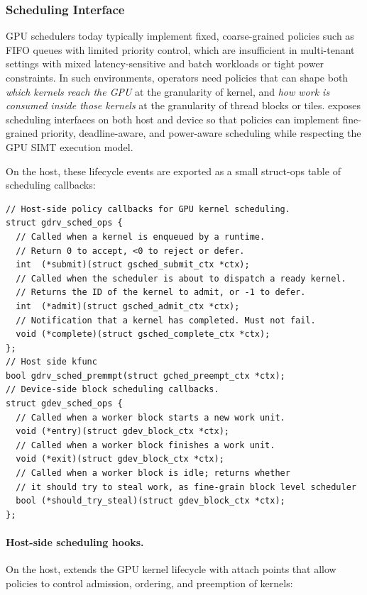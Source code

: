 \subsubsection{Scheduling Interface}
\label{sec:design-sched}

GPU schedulers today typically implement fixed, coarse-grained policies such as FIFO
queues with limited priority control, which are insufficient in multi-tenant settings
with mixed latency-sensitive and batch workloads or tight power constraints. In such
environments, operators need policies that can shape both \emph{which kernels reach
the GPU} at the granularity of kernel, and \emph{how work is consumed inside those kernels} at the granularity of thread blocks or tiles. \sys exposes scheduling interfaces on both host and device
so that policies can implement fine-grained priority, deadline-aware, and power-aware
scheduling while respecting the GPU SIMT execution model.

On the host, these lifecycle events are exported as a small struct-ops table of
scheduling callbacks:

\begin{verbatim}
// Host-side policy callbacks for GPU kernel scheduling.
struct gdrv_sched_ops {
  // Called when a kernel is enqueued by a runtime.
  // Return 0 to accept, <0 to reject or defer.
  int  (*submit)(struct gsched_submit_ctx *ctx);
  // Called when the scheduler is about to dispatch a ready kernel.
  // Returns the ID of the kernel to admit, or -1 to defer.
  int  (*admit)(struct gsched_admit_ctx *ctx);
  // Notification that a kernel has completed. Must not fail.
  void (*complete)(struct gsched_complete_ctx *ctx);
};
// Host side kfunc
bool gdrv_sched_premmpt(struct gched_preempt_ctx *ctx);
// Device-side block scheduling callbacks.
struct gdev_sched_ops {
  // Called when a worker block starts a new work unit.
  void (*entry)(struct gdev_block_ctx *ctx);
  // Called when a worker block finishes a work unit.
  void (*exit)(struct gdev_block_ctx *ctx);
  // Called when a worker block is idle; returns whether
  // it should try to steal work, as fine-grain block level scheduler
  bool (*should_try_steal)(struct gdev_block_ctx *ctx);
};
\end{verbatim}

\paragraph{Host-side scheduling hooks.}
On the host, \sys extends the GPU kernel lifecycle with attach points that allow
policies to control admission, ordering, and preemption of kernels:

